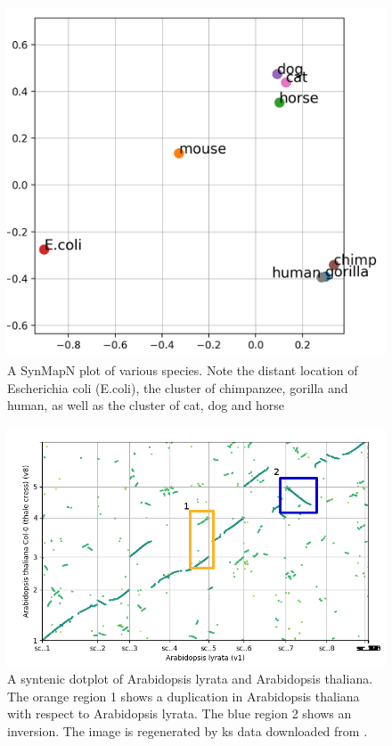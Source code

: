 \documentclass{vgtc}                      %
\begin{document}
\begin{figure}[t]
 \centering
 \includegraphics[width=0.7\columnwidth]{synmap_n}
 \caption{A SynMapN plot of various species. Note the distant location of Escherichia coli (E.coli), the cluster of chimpanzee, gorilla and human, as well as the cluster of cat, dog and horse}
 \label{fig:synmap_n}
\end{figure}

\begin{figure}[h]
 \centering
 \includegraphics[width=0.8\columnwidth]{dotplot_arabidopsis_marked}
 \caption{A syntenic dotplot of Arabidopsis lyrata and Arabidopsis thaliana. The orange region 1 shows a duplication in Arabidopsis thaliana with respect to Arabidopsis lyrata. The blue region 2 shows an inversion. The image is regenerated by ks data downloaded from \cite{arabidopsisurl}.}
 \label{fig:dotplot_arabidopsis_marked}
\end{figure}

\end{document}
